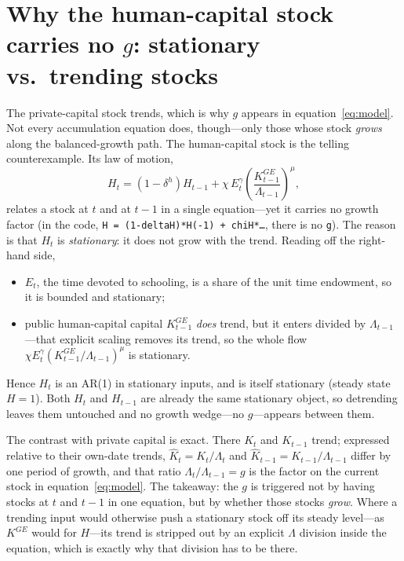 \documentclass[11pt]{article}
\begin{document}
\section{Why the human-capital stock carries no $g$: stationary vs.\ trending stocks}

The private-capital stock trends, which is why $g$ appears in
equation~\eqref{eq:model}. Not every accumulation equation does, though---only those
whose stock \emph{grows} along the balanced-growth path. The human-capital stock is the
telling counterexample. Its law of motion,
\begin{equation}\label{eq:hc}
    H_t = (1-\delta^h)H_{t-1}
        + \chi\, E_t^{\gamma}\left(\frac{K^{GE}_{t-1}}{\Lambda_{t-1}}\right)^{\mu},
\end{equation}
relates a stock at $t$ and at $t-1$ in a single equation---yet it carries no growth
factor (in the code, \texttt{H = (1-deltaH)*H(-1) + chiH*\dots}, there is no \texttt{g}).
The reason is that $H_t$ is \emph{stationary}: it does not grow with the trend. Reading
off the right-hand side,
\begin{itemize}
    \item $E_t$, the time devoted to schooling, is a share of the unit time endowment,
          so it is bounded and stationary;
    \item public human-capital capital $K^{GE}_{t-1}$ \emph{does} trend, but it enters
          divided by $\Lambda_{t-1}$---that explicit scaling removes its trend, so the
          whole flow $\chi E_t^{\gamma}(K^{GE}_{t-1}/\Lambda_{t-1})^{\mu}$ is stationary.
\end{itemize}
Hence $H_t$ is an AR(1) in stationary inputs, and is itself stationary (steady state
$H=1$). Both $H_t$ and $H_{t-1}$ are already the same stationary object, so detrending
leaves them untouched and no growth wedge---no $g$---appears between them.

The contrast with private capital is exact. There $K_t$ and $K_{t-1}$ trend; expressed
relative to their own-date trends, $\hat K_t = K_t/\Lambda_t$ and
$\hat K_{t-1} = K_{t-1}/\Lambda_{t-1}$ differ by one period of growth, and that ratio
$\Lambda_t/\Lambda_{t-1} = g$ is the factor on the current stock in
equation~\eqref{eq:model}. The takeaway: the $g$ is triggered not by having stocks at
$t$ and $t-1$ in one equation, but by whether those stocks \emph{grow}. Where a trending
input would otherwise push a stationary stock off its steady level---as $K^{GE}$ would
for $H$---its trend is stripped out by an explicit $\Lambda$ division inside the equation,
which is exactly why that division has to be there.
\end{document}
